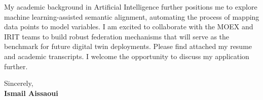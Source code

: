 \documentclass[11pt,a4paper]{article}
\begin{document}
\vspace{0.5em}
\noindent
My academic background in Artificial Intelligence further positions me to explore machine learning-assisted semantic alignment, automating the process of mapping data points to model variables. I am excited to collaborate with the MOEX and IRIT teams to build robust federation mechanisms that will serve as the benchmark for future digital twin deployments. Please find attached my resume and academic transcripts. I welcome the opportunity to discuss my application further.

\vspace{1.5em}
\noindent
Sincerely, \\[0.5em]
\textbf{Ismail Aissaoui}
\end{document}
